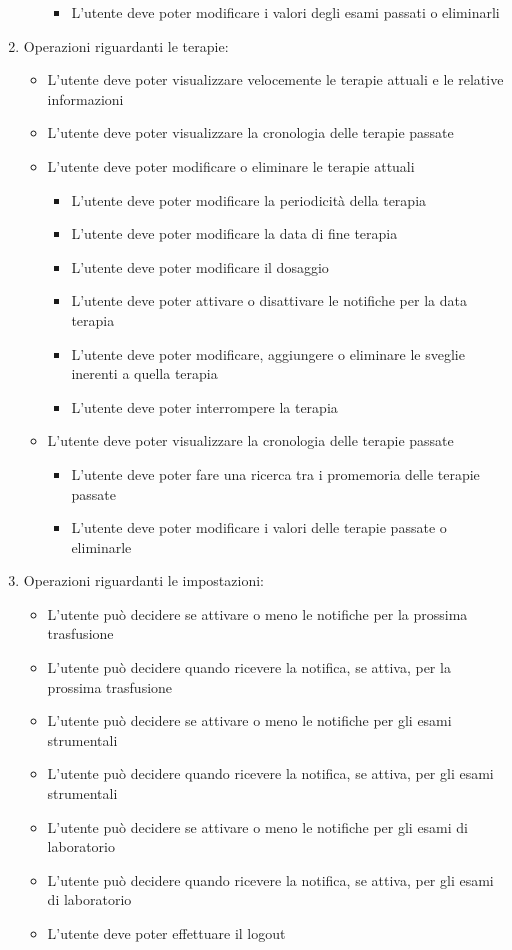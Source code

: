 \documentclass[12pt,a4paper,openright,twoside]{report}
\begin{document}
\begin{enumerate}
\begin{itemize}
\begin{itemize}
        \item L'utente deve poter modificare i valori degli esami passati o eliminarli
        \end{itemize}
    \end{itemize}
    \item Operazioni riguardanti le terapie:
    \begin{itemize}
        \item L'utente deve poter visualizzare velocemente le terapie attuali e le relative informazioni
        \item L'utente deve poter visualizzare la cronologia delle terapie passate
        \item L'utente deve poter modificare o eliminare le terapie attuali
    \begin{itemize}
    \item L'utente deve poter modificare la periodicità della terapia
    \item L'utente deve poter modificare la data di fine terapia
    \item L'utente deve poter modificare il dosaggio
    \item L'utente deve poter attivare o disattivare le notifiche per la data terapia
    \item L'utente deve poter modificare, aggiungere o eliminare le sveglie inerenti a quella terapia
    \item L'utente deve poter interrompere la terapia
    \end{itemize}
    \item L'utente deve poter visualizzare la cronologia delle terapie passate
    \begin{itemize}
    \item L'utente deve poter fare una ricerca tra i promemoria delle terapie passate
    \item L'utente deve poter modificare i valori delle terapie passate o eliminarle
    \end{itemize}
    \end{itemize}
    \item Operazioni riguardanti le impostazioni:
    \begin{itemize}
    \item L'utente può decidere se attivare o meno le notifiche per la prossima trasfusione
    \item L'utente può decidere quando ricevere la notifica, se attiva, per la prossima trasfusione
    \item L'utente può decidere se attivare o meno le notifiche per gli esami strumentali
    \item L'utente può decidere quando ricevere la notifica, se attiva, per gli esami strumentali
    \item L'utente può decidere se attivare o meno le notifiche per gli esami di laboratorio
    \item L'utente può decidere quando ricevere la notifica, se attiva, per gli esami di laboratorio
    \item L'utente deve poter effettuare il logout
    \end{itemize}
\end{enumerate}
\end{document}
